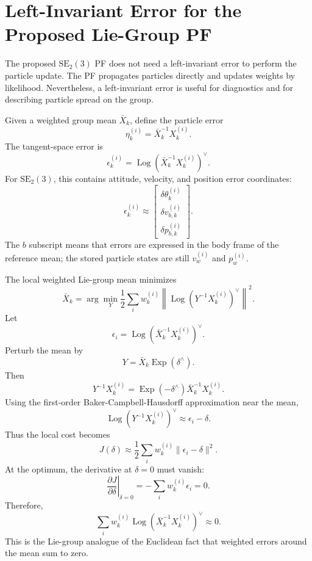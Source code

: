 \documentclass{aiaa-tc}
\newcommand{\SE}{\mathrm{SE}}
\newcommand{\Exp}{\operatorname{Exp}}
\newcommand{\Log}{\operatorname{Log}}
\begin{document}
\section{Left-Invariant Error for the Proposed Lie-Group PF}

The proposed \(\SE_2(3)\) PF does not need a left-invariant error to perform
the particle update.  The PF propagates particles directly and updates weights
by likelihood.  Nevertheless, a left-invariant error is useful for diagnostics
and for describing particle spread on the group.

Given a weighted group mean \(\bar X_k\), define the particle error
\[
\eta_k^{(i)}=\bar X_k^{-1}X_k^{(i)}.
\]
The tangent-space error is
\[
\epsilon_k^{(i)}
=
\Log\left(\bar X_k^{-1}X_k^{(i)}\right)^\vee.
\]
For \(\SE_2(3)\), this contains attitude, velocity, and position error
coordinates:
\[
\epsilon_k^{(i)}
\approx
\begin{bmatrix}
\delta\theta_k^{(i)}\\
\delta v_{b,k}^{(i)}\\
\delta p_{b,k}^{(i)}
\end{bmatrix}.
\]
The \(b\) subscript means that errors are expressed in the body frame of the
reference mean; the stored particle states are still \(v_w^{(i)}\) and
\(p_w^{(i)}\).

The local weighted Lie-group mean minimizes
\[
\bar X_k
=
\arg\min_Y
\frac{1}{2}
\sum_i w_k^{(i)}
\left\|
\Log(Y^{-1}X_k^{(i)})^\vee
\right\|^2.
\]
Let
\[
\epsilon_i=
\Log(\bar X_k^{-1}X_k^{(i)})^\vee.
\]
Perturb the mean by
\[
Y=\bar X_k\Exp(\delta^\wedge).
\]
Then
\[
Y^{-1}X_k^{(i)}
=
\Exp(-\delta^\wedge)\bar X_k^{-1}X_k^{(i)}.
\]
Using the first-order Baker-Campbell-Hausdorff approximation near the mean,
\[
\Log(Y^{-1}X_k^{(i)})^\vee
\approx
\epsilon_i-\delta.
\]
Thus the local cost becomes
\[
J(\delta)
\approx
\frac{1}{2}
\sum_i w_k^{(i)}
\|\epsilon_i-\delta\|^2.
\]
At the optimum, the derivative at \(\delta=0\) must vanish:
\[
\left.\frac{\partial J}{\partial \delta}\right|_{\delta=0}
=
-\sum_iw_k^{(i)}\epsilon_i
=0.
\]
Therefore,
\[
\sum_i w_k^{(i)}
\Log(\bar X_k^{-1}X_k^{(i)})^\vee
\approx 0.
\]
This is the Lie-group analogue of the Euclidean fact that weighted errors
around the mean sum to zero.
\end{document}
